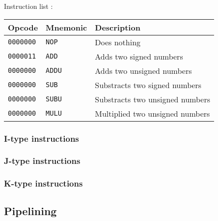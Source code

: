 \documentclass[a4paper]{report}
\begin{document}
Instruction list :

\begin{center}
	\begin{tabular}{|l|l|l|}
		\hline
		Opcode & Mnemonic & Description \\
		\hline \hline
		\texttt{0000000} & \texttt{NOP} &  Does nothing \\
		\texttt{0000011} & \texttt{ADD} &  Adds two signed numbers \\
		\texttt{0000000} & \texttt{ADDU} & Adds two unsigned numbers \\
		\texttt{0000000} & \texttt{SUB} &  Substracts two signed numbers \\
		\texttt{0000000} & \texttt{SUBU} & Substracts two unsigned numbers \\
		\texttt{0000000} & \texttt{MULU} & Multiplied two unsigned numbers \\
		\hline
	\end{tabular}
\end{center}

\subsubsection{I-type instructions}

\subsubsection{J-type instructions}

\subsubsection{K-type instructions}


\subsection{Pipelining}
\end{document}
